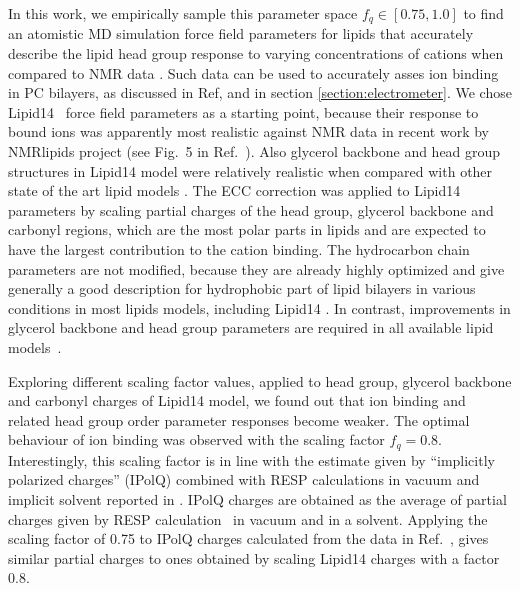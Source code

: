\documentclass[aip,jcp,twocolumn]{revtex4}
\begin{document}
In this work, we empirically sample this parameter space $f_q \in [0.75, 1.0]$
to find an atomistic MD simulation force field parameters for lipids that
accurately describe the lipid head group response to varying concentrations of cations
when compared to NMR data \cite{akutsu81,altenbach84,scherer89}. Such data can be used to accurately asses
ion binding in PC bilayers, as discussed in Ref,  and in section \ref{section:electrometer}.
We chose Lipid14~\cite{dickson14} force field parameters as a starting point,
because their response to bound ions was apparently most realistic against NMR data
in recent work by NMRlipids project (see Fig.~5 in Ref.~).
Also glycerol backbone and head group structures in Lipid14 model were
relatively realistic when compared with other state of the art lipid models \cite{botan15}.
The ECC correction was applied to Lipid14 parameters by scaling partial charges of the head group,
glycerol backbone and carbonyl regions, which are the most polar parts in lipids and
are expected to have the largest contribution to the cation binding.
The hydrocarbon chain parameters are not modified, because they are
already highly optimized and give generally a good description for
hydrophobic part of lipid bilayers in various conditions
in most lipids models, including Lipid14 \cite{ollila16}.
In contrast, improvements in glycerol backbone and head group
parameters are required in all available lipid models~\cite{botan15}. 

Exploring different scaling factor values, applied to head group, glycerol backbone
and carbonyl charges of Lipid14 model, we found out that ion binding and
related head group order parameter responses become weaker. 
The optimal behaviour of ion binding was observed with
the scaling factor $f_q = 0.8$. %
Interestingly, this scaling factor is in line with the estimate
given by ``implicitly polarized charges'' (IPolQ) \cite{ipolq2013}
combined with RESP calculations in vacuum and implicit solvent reported
in \cite{maciejewski14}. IPolQ charges are obtained as the average of
partial charges given by RESP calculation~\cite{RESP_paper}
in vacuum and in a solvent. Applying the scaling factor of 0.75 to
IPolQ charges calculated from the data in Ref.~\cite{maciejewski14},
gives similar partial charges to ones obtained by scaling Lipid14 charges
with a factor 0.8.
\end{document}
